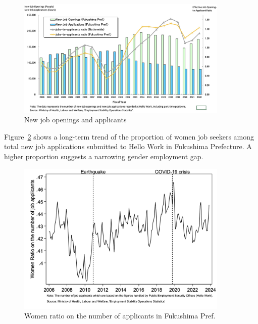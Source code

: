 \documentclass[12pt,halfline,a4paper]{ouparticle}
\begin{document}
\begin{figure}[h!]
    \centering
    \includegraphics[width=0.9\textwidth]{New Job Openings.jpeg}  %
    \caption{New job openings and applicants}
    \label{fig:new_job_openings}
\end{figure}


Figure~\ref{fig:fukushima_Women_ratio_on_applicant} shows a long-term trend of the proportion of women job seekers among total new job applications submitted to Hello Work in Fukushima Prefecture. A higher proportion suggests a narrowing gender employment gap. 

\begin{figure}[h!]
    \centering
    \includegraphics[width=0.9\textwidth]{Women ratio on the number of job applicants.jpg}  %
    \caption{Women ratio on the number of applicants in Fukushima Pref.}
    \label{fig:fukushima_Women_ratio_on_applicant}
\end{figure}
\end{document}
